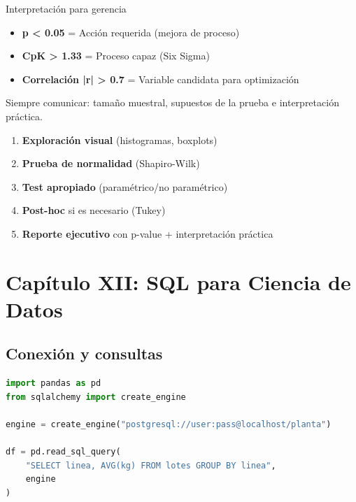 \documentclass[11pt, a4paper]{article}
\begin{document}
\begin{industrybox}{Interpretación para gerencia}
\begin{itemize}
    \item \textbf{p < 0.05} = Acción requerida (mejora de proceso)
    \item \textbf{CpK > 1.33} = Proceso capaz (Six Sigma)
    \item \textbf{Correlación |r| > 0.7} = Variable candidata para optimización
\end{itemize}

Siempre comunicar: tamaño muestral, supuestos de la prueba e interpretación práctica.
\end{industrybox}

\begin{conceptbox}
\begin{enumerate}
    \item \textbf{Exploración visual} (histogramas, boxplots)
    \item \textbf{Prueba de normalidad} (Shapiro-Wilk)
    \item \textbf{Test apropiado} (paramétrico/no paramétrico)
    \item \textbf{Post-hoc} si es necesario (Tukey)
    \item \textbf{Reporte ejecutivo} con p-value + interpretación práctica
\end{enumerate}
\end{conceptbox}

\newpage

\section{Capítulo XII: SQL para Ciencia de Datos}

\subsection{Conexión y consultas}

\begin{lstlisting}[language=Python, caption={Pandas + SQL}, upquote=true]
import pandas as pd
from sqlalchemy import create_engine

engine = create_engine("postgresql://user:pass@localhost/planta")

df = pd.read_sql_query(
    "SELECT linea, AVG(kg) FROM lotes GROUP BY linea",
    engine
)
\end{lstlisting}
\end{document}
